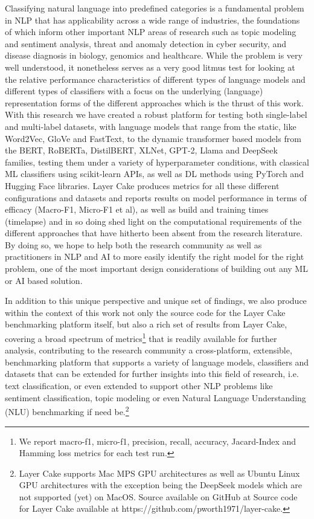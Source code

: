 \documentclass[final]{clv2025-revised}
\begin{document}
Classifying natural language into predefined categories is a fundamental problem in NLP that has applicability across a wide range of industries, the foundations of which inform other important NLP areas of research such as topic modeling and sentiment analysis, threat and anomaly detection in cyber security, and disease diagnosis in biology, genomics and healthcare. While the problem is very well understood, it nonetheless serves as a very good litmus test for looking at the relative performance characteristics of different types of language models and different types of classifiers with a focus on the underlying (language) representation forms of the different approaches which is the thrust of this work. With this research we have created a robust platform for testing both single-label and multi-label datasets, with language models that range from the static, like Word2Vec, GloVe and FastText, to the dynamic transformer based models from the BERT, RoBERTa, DistilBERT, XLNet, GPT-2, Llama and DeepSeek families, testing them under a variety of hyperparameter conditions, with classical ML classifiers using scikit-learn APIs, as well as DL methods using PyTorch and Hugging Face libraries. Layer Cake produces metrics for all these different configurations and datasets and reports results on model performance in terms of efficacy (Macro-F1, Micro-F1 et al), as well as build and training times (timelapse) and in so doing shed light on the computational requirements of the different approaches that have hitherto been absent from the research literature. By doing so, we hope to help both the research community as well as practitioners in NLP and AI to more easily identify the right model for the right problem, one of the most important design considerations of building out any ML or AI based solution.

In addition to this unique perspective and unique set of findings, we also produce within the context of this work not only the source code for the Layer Cake benchmarking platform itself, but also a rich set of results from Layer Cake, covering a broad spectrum of metrics\footnote{We report macro-f1, micro-f1, precision, recall, accuracy, Jacard-Index and Hamming loss metrics for each test run.} that is readily available for further analysis, contributing to the research community a cross-platform, extensible, benchmarking platform that supports a variety of language models, classifiers and datasets that can be extended for further insights into this field of research, i.e. text classification, or even extended to support other NLP problems like sentiment classification, topic modeling or even Natural Language Understanding (NLU) benchmarking if need be.\footnote{Layer Cake supports Mac MPS GPU architectures as well as Ubuntu Linux GPU architectures with the exception being the DeepSeek models which are not supported (yet) on MacOS. Source available on GitHub at Source code for Layer Cake available at https://github.com/pworth1971/layer-cake.} 
\end{document}

